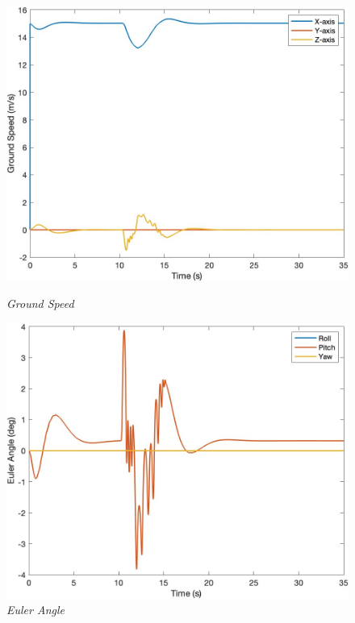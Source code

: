 \begin{figure}[htbp]
  \begin{minipage}[b]{0.45\textwidth}
    \centering
    \includegraphics[width=\textwidth]{Images/Gust/Gust FWD pulse 0428/3 groundspeed_1.jpg}
    \caption*{\textit{Ground Speed}}
  \end{minipage}
  \hfil
  \begin{minipage}[b]{0.45\textwidth}
    \centering
    \includegraphics[width=\textwidth]{Images/Gust/Gust FWD pulse 0428/4 EulerAngle_1.jpg}
    \caption*{\textit{Euler Angle}}
  \end{minipage}
  \begin{minipage}[b]{0.45\textwidth}

\end{minipage}
\end{figure}
